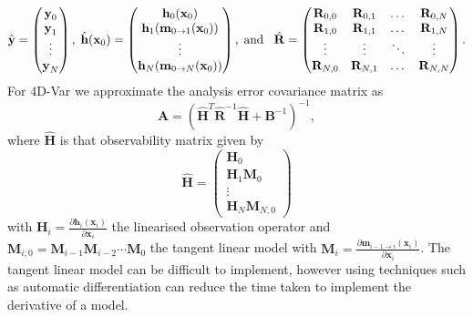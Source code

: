 \documentclass[12pt]{article}
\begin{document}
\begin{equation}
\hat{\textbf{y}} =
\begin{pmatrix}
\textbf{y}_0 \\
\textbf{y}_1\\
\vdots \\
\textbf{y}_N
\end{pmatrix},
\hspace{1mm}
\hat{\textbf{h}}(\textbf{x}_0)=
\begin{pmatrix}
\textbf{h}_0(\textbf{x}_0) \\
\textbf{h}_1(\textbf{m}_{0\rightarrow 1}(\mathbf{x}_{0}))\\
\vdots \\
\textbf{h}_N(\textbf{m}_{0\rightarrow N}(\mathbf{x}_{0}))
\end{pmatrix}, \\
\hspace{1mm} \text{and} \hspace{3mm}
\hat{\mathbf{R}} =
\begin{pmatrix}
\mathbf{R}_{0, 0} & \mathbf{R}_{0, 1} & \dots & \mathbf{R}_{0, N} \\
\mathbf{R}_{1, 0} & \mathbf{R}_{1, 1} & \dots & \mathbf{R}_{1, N} \\
\vdots & \vdots & \ddots & \vdots \\
\mathbf{R}_{N, 0} & \mathbf{R}_{N, 1} & \dots & \mathbf{R}_{N, N}
\end{pmatrix}.
\end{equation}
For 4D-Var we approximate the analysis error covariance matrix as
\begin{equation}
\textbf{A} = (\hat{\textbf{H}}^{T}\hat{\textbf{R}}^{-1}\hat{\textbf{H}}+\textbf{B}^{-1})^{-1}, \label{eqn:a_cov_4dvar}
\end{equation}
where \(\hat{\textbf{H}}\) is that observability matrix given by
\begin{equation}
\hat{\mathbf{H}}=
\begin{pmatrix}
\mathbf{H}_0 \\
\mathbf{H}_1\mathbf{M}_0\\
\vdots \\
\mathbf{H}_N\mathbf{M}_{N,0}
\end{pmatrix}
\end{equation}
with $\textbf{H}_i = \frac{\partial \textbf{h}_i(\textbf{x}_i)}{\partial\textbf{x}_i}$ the linearised observation operator and $\mathbf{M}_{i,0}=\mathbf{M}_{i-1}\mathbf{M}_{i-2}\cdots\mathbf{M}_0$ the tangent linear model with $\mathbf{M}_i=\frac{\partial \textbf{m}_{i-1\rightarrow i}(\textbf{x}_{i})}{\partial \textbf{x}_{i}}$. The tangent linear model can be difficult to implement, however using techniques such as automatic differentiation \citep{renaud1997automatic} can reduce the time taken to implement the derivative of a model. 
\end{document}
